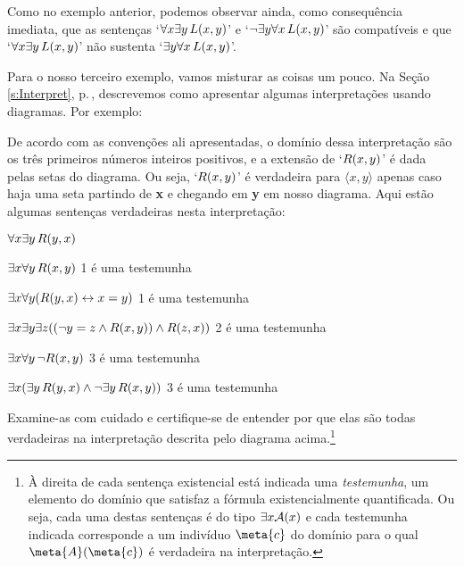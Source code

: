 Como no exemplo anterior, podemos observar ainda, como consequência imediata, que as sentenças `$\forall x \exists y\, \mathord{L}(x,y)$' e `$\neg\exists y \forall x\, \mathord{L}(x,y)$' são compatíveis e que `$\forall x \exists y\, \mathord{L}(x,y)$' não sustenta `$\exists y \forall x\, \mathord{L}(x,y)$'.

Para o nosso terceiro exemplo, vamos misturar as coisas um pouco.
Na Seção \ref{s:Interpret}, p.\,\pageref{s:Interpret}, descrevemos como apresentar algumas interpretações usando diagramas. Por exemplo:
\begin{center}
\end{center}
De acordo com as convenções ali apresentadas, o domínio dessa interpretação são os três primeiros números inteiros positivos, e a extensão de  `$\mathord{R}(x,y)$' é dada pelas setas do diagrama.
Ou seja, `$\mathord{R}(x,y)$' é verdadeira para $\langle x, y \rangle$ apenas caso haja uma seta partindo  de \textbf{x} e chegando em \textbf{y} em nosso diagrama.
Aqui estão algumas sentenças verdadeiras nesta interpretação:
	\begin{ebullet}
		\item $\forall x \exists y\, \mathord{R}(y,x)$ 
		\item $\exists x \forall y\, \mathord{R}(x,y)$ \hfill  {\footnotesize 1 é uma testemunha}
		\item $\exists x \forall y (\mathord{R}(y,x) \leftrightarrow x = y)$ \hfill {\footnotesize 1 é uma testemunha}
		\item $\exists x \exists y \exists z ((\neg y = z \wedge \mathord{R}(x,y)) \wedge \mathord{R}(z,x))$ \hfill {\footnotesize 2 é uma testemunha}
		\item $\exists x \forall y\, \neg \mathord{R}(x,y)$ \hfill {\footnotesize 3 é uma testemunha}
		\item $\exists x (\exists y\, \mathord{R}(y,x) \wedge \neg \exists y\, \mathord{R}(x,y))$ \hfill {\footnotesize 3 é uma testemunha}
	\end{ebullet}
Examine-as com cuidado e certifique-se de entender por que elas são todas verdadeiras na interpretação descrita pelo diagrama acima.\footnote{
	À direita de cada sentença existencial está indicada uma \textit{testemunha}, um elemento do domínio que satisfaz a fórmula existencialmente quantificada.
	Ou seja, cada uma destas sentenças é do tipo $\exists x \mathord{\mathcal{A}}(x)$ e cada testemunha indicada corresponde a um indivíduo $\meta{c}$ do domínio para o qual $\atom{\meta{A}}{\meta{c}}$ é verdadeira na interpretação.}	
	
